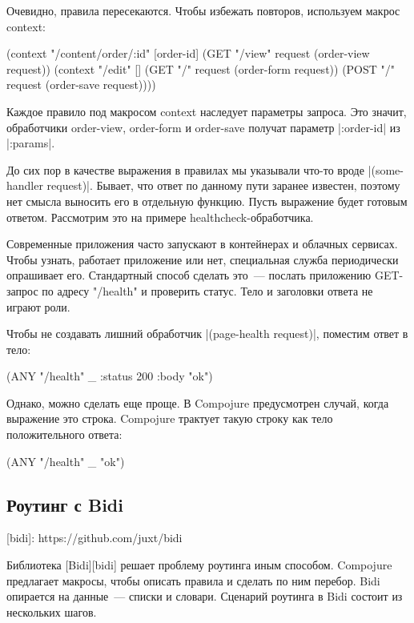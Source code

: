 Очевидно, правила пересекаются. Чтобы избежать повторов, используем макрос context:

\begin{code}
(context "/content/order/:id" [order-id]
  (GET  "/view" request (order-view request))
  (context "/edit" []
    (GET  "/" request (order-form request))
    (POST "/" request (order-save request))))
\end{code}

Каждое правило под макросом context наследует параметры запроса. Это значит,
обработчики order-view, order-form и order-save получат параметр \spverb|:order-id| из
\spverb|:params|.

До сих пор в качестве выражения в правилах мы указывали что-то вроде
\spverb|(some-handler request)|. Бывает, что ответ по данному пути заранее известен,
поэтому нет смысла выносить его в отдельную функцию. Пусть выражение будет
готовым ответом. Рассмотрим это на примере healthcheck-обработчика.

Современные приложения часто запускают в контейнерах и облачных сервисах.  Чтобы
узнать, работает приложение или нет, специальная служба периодически опрашивает
его. Стандартный способ сделать это~--- послать приложению GET-запрос по адресу
"/health" и проверить статус. Тело и заголовки ответа не играют роли.

Чтобы не создавать лишний обработчик \spverb|(page-health request)|, поместим ответ в
тело:

\begin{code}
(ANY "/health" _ {:status 200 :body "ok"})
\end{code}

Однако, можно сделать еще проще. В Compojure предусмотрен случай, когда
выражение это строка. Compojure трактует такую строку как тело положительного
ответа:

\begin{code}
(ANY "/health" _ "ok")
\end{code}

\subsection{Роутинг с Bidi}

[bidi]: https://github.com/juxt/bidi

Библиотека [Bidi][bidi] решает проблему роутинга иным способом. Compojure
предлагает макросы, чтобы описать правила и сделать по ним перебор. Bidi
опирается на данные~--- списки и словари. Сценарий роутинга в Bidi состоит из
нескольких шагов.

